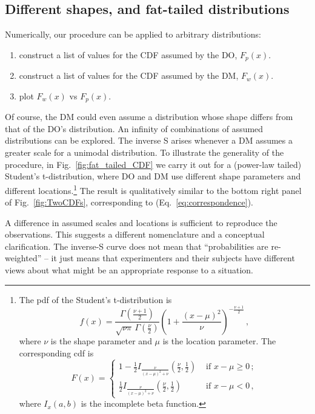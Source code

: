 \documentclass[a4paper, 12pt]{article}
\newcommand{\eref}[1]{(Eq.~\ref{eq:#1})}
\newcommand{\fref}[1]{Fig.~\ref{fig:#1}}
\newcommand{\seclabel}[1]{\label{sec:#1}}
\newcommand{\be}{\begin{equation}}
\newcommand{\ee}{\end{equation}}
\begin{document}
\subsection{Different shapes, and fat-tailed distributions\seclabel{Different_shapes}}
Numerically, our procedure can be applied to arbitrary distributions: 
\begin{enumerate}
\item
construct a list of values for the CDF assumed by the DO, $F_p(x)$.
\item
construct a list of values for the CDF assumed by the DM, $F_w(x)$.
\item
plot $F_w(x)$ vs $F_p(x)$.
\end{enumerate}
Of course, the DM could even assume a distribution whose shape differs from that of the DO's distribution. An infinity of combinations of assumed distributions can be explored. The inverse S arises whenever a DM assumes a greater scale for a unimodal distribution. To illustrate the generality of the procedure, in \fref{fat_tailed_CDF} we carry it out for a (power-law tailed) Student's t-distribution, where DO and DM use different shape parameters and different locations.\footnote{The pdf of the Student's t-distribution is
%
\be
f\left(x\right) = \frac{\Gamma\left(\frac{\nu+1}{2}\right)} {\sqrt{\nu\pi}\,\Gamma\left(\frac{\nu}{2}\right)} \left(1+\frac{\left(x-\mu\right)^2}{\nu} \right)^{-\frac{\nu+1}{2}}\,,
\ee
%
where $\nu$ is the shape parameter and $\mu$ is the location parameter. The corresponding cdf is
%
\be
F\left(x\right) = 
\begin{cases}
1 - \frac{1}{2} I_{\frac{\nu}{\left(x-\mu\right)^2 + \nu}}\left(\frac{\nu}{2},\frac{1}{2}\right) &\text{ if } x-\mu \geq 0\,;\\
\frac{1}{2} I_{\frac{\nu}{\left(x-\mu\right)^2 + \nu}}\left(\frac{\nu}{2},\frac{1}{2}\right) &\text{ if } x-\mu < 0\,,
\end{cases}
\ee
where $I_x\left(a,b\right)$ is the incomplete beta function.
%
}
The result is qualitatively similar to the bottom right panel of \fref{TwoCDFs}, corresponding to \eref{correspondence}. 

A difference in assumed scales and locations is sufficient to reproduce the observations. This suggests a different nomenclature and a conceptual clarification. The inverse-S curve does not mean that ``probabilities are re-weighted'' -- it just means that experimenters and their subjects have different views about what might be an appropriate response to a situation. 
\end{document}

